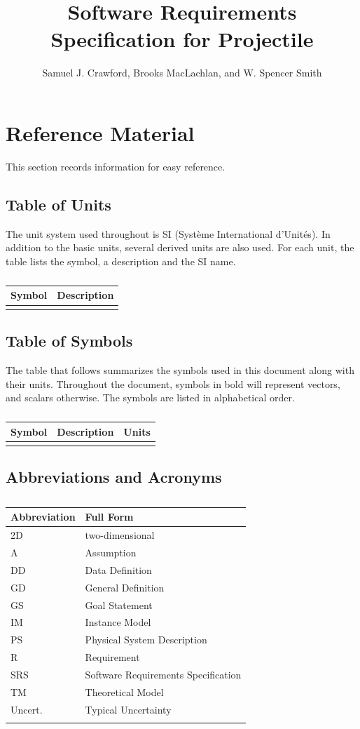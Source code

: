 \documentclass[12pt]{article}
\title{Software Requirements Specification for Projectile}
\author{Samuel J. Crawford, Brooks MacLachlan, and W. Spencer Smith}
\begin{document}
\maketitle
\tableofcontents
\newpage
\section{Reference Material}
\label{Sec:RefMat}
This section records information for easy reference.
\subsection{Table of Units}
\label{Sec:ToU}
The unit system used throughout is SI (Système International d'Unités). In addition to the basic units, several derived units are also used. For each unit, the table lists the symbol, a description and the SI name.
\begin{longtable}{l l}
\toprule
Symbol & Description
\\
\midrule
\endhead
\bottomrule
\caption{}
\label{Table:ToU}
\end{longtable}
\subsection{Table of Symbols}
\label{Sec:ToS}
The table that follows summarizes the symbols used in this document along with their units. Throughout the document, symbols in bold will represent vectors, and scalars otherwise. The symbols are listed in alphabetical order.
\begin{longtable}{l l l}
\toprule
Symbol & Description & Units
\\
\midrule
\endhead
\bottomrule
\caption{}
\label{Table:ToS}
\end{longtable}
\subsection{Abbreviations and Acronyms}
\label{Sec:TAbbAcc}
\begin{longtable}{l l}
\toprule
Abbreviation & Full Form
\\
\midrule
\endhead
2D & two-dimensional
\\
A & Assumption
\\
DD & Data Definition
\\
GD & General Definition
\\
GS & Goal Statement
\\
IM & Instance Model
\\
PS & Physical System Description
\\
R & Requirement
\\
SRS & Software Requirements Specification
\\
TM & Theoretical Model
\\
Uncert. & Typical Uncertainty
\\
\bottomrule
\caption{}
\label{Table:TAbbAcc}
\end{longtable}
\end{document}
